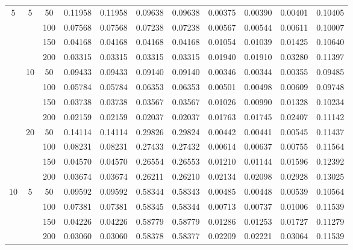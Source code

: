 \documentclass[11pt]{article}
\begin{document}
\begin{center}
\begin{longtable}{|c|c|c|c|c|c|c|c|c|c|c|}
		\multirow{12}{*}{$5$}   
		& \multirow{4}{*}{5}  &50  & 0.11958 & 0.11958 & 0.09638 & 0.09638 & 0.00375 & 0.00390 & 0.00401 & 0.10405 \\   \cline{3-11} 
		&                     &100 & 0.07568 & 0.07568 & 0.07238 & 0.07238 & 0.00567 & 0.00544 & 0.00611 & 0.10007 \\   \cline{3-11} 
		&                     &150 & 0.04168 & 0.04168 & 0.04168 & 0.04168 & 0.01054 & 0.01039 & 0.01425 & 0.10640 \\   \cline{3-11} 
		&                     &200 & 0.03315 & 0.03315 & 0.03315 & 0.03315 & 0.01940 & 0.01910 & 0.03280 & 0.11397 \\   \cline{2-11} 
		& \multirow{4}{*}{10} &50  & 0.09433 & 0.09433 & 0.09140 & 0.09140 & 0.00346 & 0.00344 & 0.00355 & 0.09485 \\  \cline{3-11} 
		&                     &100 & 0.05784 & 0.05784 & 0.06353 & 0.06353 & 0.00501 & 0.00498 & 0.00609 & 0.09748 \\   \cline{3-11} 
		&                     &150 & 0.03738 & 0.03738 & 0.03567 & 0.03567 & 0.01026 & 0.00990 & 0.01328 & 0.10234 \\   \cline{3-11} 
		&                     &200 & 0.02159 & 0.02159 & 0.02037 & 0.02037 & 0.01763 & 0.01745 & 0.02407 & 0.11142 \\   \cline{2-11}
		& \multirow{4}{*}{20} &50  & 0.14114 & 0.14114 & 0.29826 & 0.29824 & 0.00442 & 0.00441 & 0.00545 & 0.11437 \\  \cline{3-11} 
		&                     &100 & 0.08231 & 0.08231 & 0.27433 & 0.27432 & 0.00614 & 0.00637 & 0.00755 & 0.11564 \\   \cline{3-11} 
		&                     &150 & 0.04570 & 0.04570 & 0.26554 & 0.26553 & 0.01210 & 0.01144 & 0.01596 & 0.12392 \\  \cline{3-11} 
		&                     &200 & 0.03674 & 0.03674 & 0.26211 & 0.26210 & 0.02134 & 0.02098 & 0.02928 & 0.13025 \\   \hline
		\multirow{12}{*}{$10$}   
		& \multirow{4}{*}{5}  &50  & 0.09592 & 0.09592 & 0.58344 & 0.58343 & 0.00485 & 0.00448 & 0.00539 & 0.10564 \\  \cline{3-11} 
		&                     &100 & 0.07381 & 0.07381 & 0.58345 & 0.58344 & 0.00713 & 0.00737 & 0.01006 & 0.11539 \\  \cline{3-11} 
		&                     &150 & 0.04226 & 0.04226 & 0.58779 & 0.58779 & 0.01286 & 0.01253 & 0.01727 & 0.11279 \\  \cline{3-11} 
		&                     &200 & 0.03060 & 0.03060 & 0.58378 & 0.58377 & 0.02209 & 0.02221 & 0.03064 & 0.11539 \\  \cline{2-11} 

\end{longtable}
\end{center}
\end{document}
